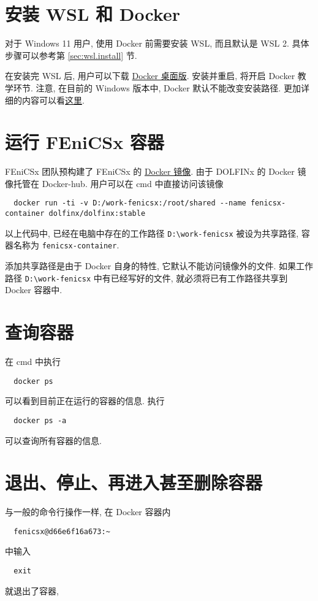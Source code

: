 \documentclass[fontset=founder]{ctexrep}
\begin{document}
\section{安装 WSL 和 Docker}

对于 Windows 11 用户,
使用 Docker 前需要安装 WSL,
而且默认是 WSL 2.
具体步骤可以参考第 \ref{sec:wsl.install} 节.

在安装完 WSL 后,
用户可以下载 \href{https://www.docker.com/get-started}{Docker 桌面版}.
安装并重启,
将开启 Docker 教学环节.
注意,
在目前的 Windows 版本中,
Docker 默认不能改变安装路径.
更加详细的内容可以看\href{https://docs.docker.com/desktop/windows/install/}{这里}.

\section{运行 FEniCSx 容器}

FEniCSx 团队预构建了 FEniCSx 的 \href{https://hub.docker.com/u/dolfinx}{Docker 镜像}.
由于 DOLFINx 的 Docker 镜像托管在 Docker-hub.
用户可以在 \textsf{cmd} 中直接访问该镜像
\begin{lstlisting}
  docker run -ti -v D:/work-fenicsx:/root/shared --name fenicsx-container dolfinx/dolfinx:stable
\end{lstlisting}
以上代码中,
已经在电脑中存在的工作路径 \texttt{D:\textbackslash work-fenicsx} 被设为共享路径,
容器名称为 \texttt{fenicsx-container}.

添加共享路径是由于 Docker 自身的特性,
它默认不能访问镜像外的文件.
如果工作路径 \texttt{D:\textbackslash work-fenicsx} 中有已经写好的文件,
就必须将已有工作路径共享到 Docker 容器中.

\section{查询容器}

在 \textsf{cmd} 中执行
\begin{lstlisting}
  docker ps
\end{lstlisting}
可以看到目前正在运行的容器的信息.
执行
\begin{lstlisting}
  docker ps -a
\end{lstlisting}
可以查询所有容器的信息.

\section{退出、停止、再进入甚至删除容器}

与一般的命令行操作一样,
在 Docker 容器内
\begin{lstlisting}
  fenicsx@d66e6f16a673:~
\end{lstlisting}
中输入
\begin{lstlisting}
  exit
\end{lstlisting}
就退出了容器,
\end{document}
